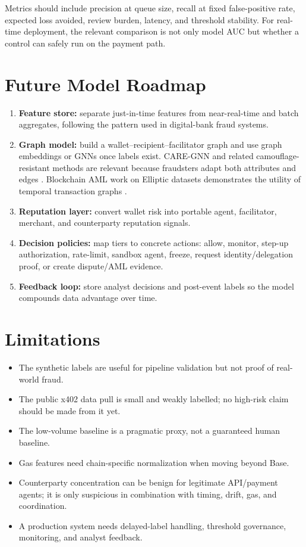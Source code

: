 \documentclass[11pt]{article}
\begin{document}
Metrics should include precision at queue size, recall at fixed false-positive
rate, expected loss avoided, review burden, latency, and threshold stability.
For real-time deployment, the relevant comparison is not only model AUC but
whether a control can safely run on the payment path.

\section{Future Model Roadmap}

\begin{enumerate}
  \item \textbf{Feature store:} separate just-in-time features from
        near-real-time and batch aggregates, following the pattern used in
        digital-bank fraud systems.
  \item \textbf{Graph model:} build a wallet--recipient--facilitator graph and
        use graph embeddings or GNNs once labels exist.  CARE-GNN and related
        camouflage-resistant methods are relevant because fraudsters adapt both
        attributes and edges \cite{caregnn}.  Blockchain AML work on Elliptic
        datasets demonstrates the utility of temporal transaction graphs
        \cite{ellipticGcn,elliptic2}.
  \item \textbf{Reputation layer:} convert wallet risk into portable agent,
        facilitator, merchant, and counterparty reputation signals.
  \item \textbf{Decision policies:} map tiers to concrete actions: allow,
        monitor, step-up authorization, rate-limit, sandbox agent, freeze,
        request identity/delegation proof, or create dispute/AML evidence.
  \item \textbf{Feedback loop:} store analyst decisions and post-event labels
        so the model compounds data advantage over time.
\end{enumerate}

\section{Limitations}

\begin{itemize}
  \item The synthetic labels are useful for pipeline validation but not proof of
        real-world fraud.
  \item The public x402 data pull is small and weakly labelled; no high-risk
        claim should be made from it yet.
  \item The low-volume baseline is a pragmatic proxy, not a guaranteed human
        baseline.
  \item Gas features need chain-specific normalization when moving beyond Base.
  \item Counterparty concentration can be benign for legitimate API/payment
        agents; it is only suspicious in combination with timing, drift, gas,
        and coordination.
  \item A production system needs delayed-label handling, threshold governance,
        monitoring, and analyst feedback.
\end{itemize}
\end{document}
